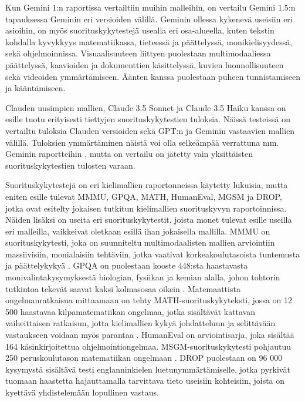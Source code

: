 Kun Gemini 1:n raportissa \parencite{googleDeepmindGeminiv1report} vertailtiin
muihin malleihin, on vertailu Gemini 1.5:n
\parencite{googleDeepmindGeminiv1report} tapauksessa Geminin eri versioiden
välillä. Geminin ollessa kykenevä useisiin eri asioihin, on myös
suorituskykytestejä usealla eri osa-alueella, kuten tekstin kohdalla
kyvykkyys matematiikassa, tieteessä ja päättelyssä, monikielisyydessä,
sekä ohjelmoinnissa. Visuaalisuuteen liittyen puolestaan multimodaaliessa
päättelyssä, kaavioiden ja dokumenttien käsittelyssä, kuvien luonnollisuuteen
sekä videoiden ymmärtämiseen. Äänten kanssa puolestaan puheen tunnistamiseen ja
kääntämiseen.

Clauden uusimpien mallien, Claude 3.5 Sonnet ja Claude 3.5 Haiku kanssa on
esille tuotu erityisesti tiettyjen suorituskykytestien tuloksia. Näissä
testeissä on vertailtu tuloksia Clauden versioiden sekä GPT:n ja Geminin
vastaavien mallien välillä. \parencite{anthropicClaudeSonnetAndHaiku35}
\parencite{anthropicClaudeSonnet} \parencite{anthropicClaudeHaiku} Tuloksien
ymmärtäminen näistä voi olla selkeämpää verrattuna mm. Geminin raportteihin
\parencite{googleDeepmindGeminiv1report}
\parencite{googleDeepmindGeminiv1_5report}, mutta on vertailu on jätetty vain
yksittäisten suorituskykytestien tulosten varaan.

Suorituskykytestejä on eri kielimallien raportonneissa
\parencite{anthropicClaudeSonnetAndHaiku35} \parencite{openAI2023GPT4}
\parencite{openAIGPT4o} \parencite{googleDeepmindGeminiv1_5report} käytetty
lukuisia, mutta eniten esille tulevat MMMU, GPQA, MATH, HumanEval, MGSM ja
DROP, jotka ovat esitelty jokaisen tutkitun kielimallien suorituskyvyn
raportoinnissa. Näiden lisäksi on useita eri suorituskykytestit, joista monet
tulevat esille useilla eri malleilla, vaikkeivat oletkaan esillä ihan
jokaisella mallilla. MMMU on suorituskykytesti, joka on suunniteltu
multimodaalisten mallien arviointiin massiivisiin, monialaisiin tehtäviin,
jotka vaativat korkeakoulutasoista tuntemusta ja päättelykykyä
\parencite{benchmarkMMMU}. GPQA on puolestaan kooste 448:sta haastavasta
monivalintakysymyksestä biologian, fysiikan ja kemian alalla, johon tohtorin
tutkintoa tekevät saavat kaksi kolmasosaa oikein \parencite{benchmarkGPQA}.
Matemaattista ongelmanratkaisua mittaamaan on tehty MATH-suorituskykyteksti,
jossa on 12 500 haastavaa kilpamatematiikan ongelmaa, jotka sisältävät
kattavan vaiheittaisen ratkaisun, jotta kielimallien kykyä johdatteluun ja
selittävään vastaukseen voidaan myös parantaa \parencite{benchmarkMATH}.
HumanEval \parencite{benchmarkHumanEval} on arviointisarja, joka sisältää
164 käsinkirjoitettua ohjelmointiongelmaa. MSGM-suorituskykytesti pohjautuu
250 peruskoulutason matematiikan ongelmaan \parencite{benchmarkMSGM}. DROP
puolestaan on 96 000 kysymystä sisältävä testi englanninkielen
luetunymmärtämiselle, jotka pyrkivät tuomaan haastetta hajauttamalla
tarvittava tieto useisiin kohteisiin, joista on kyettävä yhdistelemään
lopullinen vastaus.

